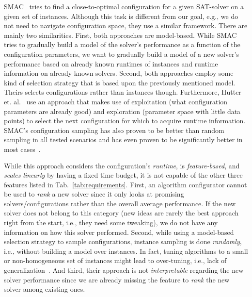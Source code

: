 \documentclass[runningheads]{llncs}
\begin{document}
SMAC~\cite{HutterHL11} tries to find a close-to-optimal configuration for a given SAT-solver on a given set of instances.
Although this task is different from our goal, e.g., we do not need to navigate configuration space, they use a similar framework.
There are mainly two similarities.
First, both approaches are model-based.
While SMAC tries to gradually build a model of the solver's performance as a function of the configuration parameters, we want to gradually build a model of a new solver's performance based on already known runtimes of instances and runtime information on already known solvers.
Second, both approaches employ some kind of selection strategy that is based upon the previously mentioned model.
Theirs selects configurations rather than instances though.
Furthermore, Hutter et. al.~\cite{HutterHL11} use an approach that makes use of exploitation (what configuration parameters are already good) and exploration (parameter space with little data points) to select the next configuration for which to acquire runtime information.
SMAC's configuration sampling has also proven to be better than random sampling in all tested scenarios and has even proven to be significantly better in most cases~\cite{HutterHL11}.

While this approach considers the configuration's \emph{runtime}, is \emph{feature-based}, and \emph{scales linearly} by having a fixed time budget, it is not capable of the other three features listed in Tab.~\ref{tab:requirements}.
First, an algorithm configurator cannot be used to \emph{rank} a new solver since it only looks at promising solvers/configurations rather than the overall average performance.
If the new solver does not belong to this category (new ideas are rarely the best approach right from the start, i.e., they need some tweaking), we do not have any information on how this solver performed.
Second, while using a model-based selection strategy to sample configurations, instance sampling is done \emph{randomly}, i.e., without building a model over instances.
In fact, tuning algorithms to a small or non-homogeneous set of instances might lead to over-tuning, i.e., lack of generalization~\cite{eggensperger2019pitfalls}.
And third, their approach is not \emph{interpretable} regarding the new solver performance since we are already missing the feature to \emph{rank} the new solver among existing ones.
\end{document}
